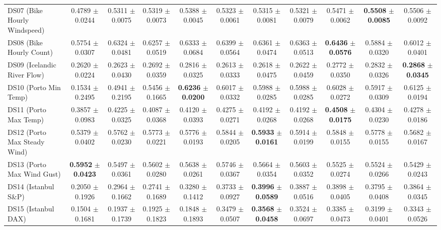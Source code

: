 \begin{table}[t]
{{\begin{tabular}{lcccccccccc}
DS07 (Bike Hourly Windspeed) & 0.4789 $\pm$ 0.0244 & 0.5311 $\pm$ 0.0075 & 0.5319 $\pm$ 0.0073 & 0.5388 $\pm$ 0.0045 & 0.5323 $\pm$ 0.0061 & 0.5315 $\pm$ 0.0081 & 0.5321 $\pm$ 0.0079 & 0.5471 $\pm$ 0.0062 & \textbf{0.5508} $\pm$ \textbf{0.0085} & 0.5506 $\pm$ 0.0092 \\
DS08 (Bike Hourly Count) & 0.5754 $\pm$ 0.0307 & 0.6324 $\pm$ 0.0481 & 0.6257 $\pm$ 0.0519 & 0.6333 $\pm$ 0.0684 & 0.6399 $\pm$ 0.0564 & 0.6361 $\pm$ 0.0474 & 0.6363 $\pm$ 0.0513 & \textbf{0.6436} $\pm$ \textbf{0.0576} & 0.5884 $\pm$ 0.0320 & 0.6012 $\pm$ 0.0401 \\
DS09 (Icelandic River Flow) & 0.2620 $\pm$ 0.0224 & 0.2623 $\pm$ 0.0430 & 0.2692 $\pm$ 0.0359 & 0.2816 $\pm$ 0.0325 & 0.2613 $\pm$ 0.0333 & 0.2618 $\pm$ 0.0475 & 0.2622 $\pm$ 0.0459 & 0.2772 $\pm$ 0.0350 & 0.2832 $\pm$ 0.0326 & \textbf{0.2868} $\pm$ \textbf{0.0345} \\
DS10 (Porto Min Temp) & 0.1534 $\pm$ 0.2495 & 0.4941 $\pm$ 0.2195 & 0.5456 $\pm$ 0.1665 & \textbf{0.6236} $\pm$ \textbf{0.0200} & 0.6017 $\pm$ 0.0332 & 0.5988 $\pm$ 0.0285 & 0.5988 $\pm$ 0.0285 & 0.6028 $\pm$ 0.0272 & 0.5917 $\pm$ 0.0309 & 0.6125 $\pm$ 0.0194 \\
DS11 (Porto Max Temp) & 0.3857 $\pm$ 0.0983 & 0.4225 $\pm$ 0.0325 & 0.4087 $\pm$ 0.0368 & 0.4120 $\pm$ 0.0393 & 0.4275 $\pm$ 0.0271 & 0.4192 $\pm$ 0.0268 & 0.4192 $\pm$ 0.0268 & \textbf{0.4508} $\pm$ \textbf{0.0175} & 0.4304 $\pm$ 0.0230 & 0.4278 $\pm$ 0.0186 \\
DS12 (Porto Max Steady Wind) & 0.5379 $\pm$ 0.0402 & 0.5762 $\pm$ 0.0230 & 0.5773 $\pm$ 0.0221 & 0.5776 $\pm$ 0.0193 & 0.5844 $\pm$ 0.0205 & \textbf{0.5933} $\pm$ \textbf{0.0161} & 0.5914 $\pm$ 0.0199 & 0.5848 $\pm$ 0.0155 & 0.5778 $\pm$ 0.0155 & 0.5682 $\pm$ 0.0167 \\
DS13 (Porto Max Wind Gust) & \textbf{0.5952} $\pm$ \textbf{0.0423} & 0.5497 $\pm$ 0.0361 & 0.5602 $\pm$ 0.0280 & 0.5638 $\pm$ 0.0261 & 0.5746 $\pm$ 0.0367 & 0.5664 $\pm$ 0.0354 & 0.5603 $\pm$ 0.0352 & 0.5525 $\pm$ 0.0274 & 0.5524 $\pm$ 0.0266 & 0.5429 $\pm$ 0.0243 \\
DS14 (Istanbul S\&P) & 0.2050 $\pm$ 0.1926 & 0.2964 $\pm$ 0.1662 & 0.2741 $\pm$ 0.1689 & 0.3280 $\pm$ 0.1412 & 0.3733 $\pm$ 0.0927 & \textbf{0.3996} $\pm$ \textbf{0.0589} & 0.3887 $\pm$ 0.0516 & 0.3898 $\pm$ 0.0405 & 0.3795 $\pm$ 0.0408 & 0.3864 $\pm$ 0.0345 \\
DS15 (Istanbul DAX) & 0.1504 $\pm$ 0.1681 & 0.1937 $\pm$ 0.1739 & 0.1925 $\pm$ 0.1823 & 0.1848 $\pm$ 0.1893 & 0.3479 $\pm$ 0.0507 & \textbf{0.3568} $\pm$ \textbf{0.0458} & 0.3524 $\pm$ 0.0697 & 0.3385 $\pm$ 0.0473 & 0.3199 $\pm$ 0.0401 & 0.3343 $\pm$ 0.0526 \\

\end{tabular}}}
\end{table}
